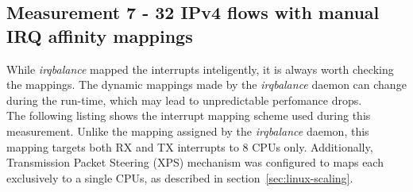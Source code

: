 
\subsection{Measurement 7 - 32 IPv4 flows with manual IRQ affinity mappings}
While {\it{irqbalance}} mapped the interrupts inteligently, it is always worth checking the mappings.
The dynamic mappings made by the {\it{irqbalance}} daemon can change during the run-time, which may lead
to unpredictable perfomance drops.
\\
The following listing shows the interrupt mapping scheme used during this measurement.
Unlike the mapping assigned by the {\it{irqbalance}} daemon,
this mapping targets both RX and TX interrupts to 8 CPUs only.
Additionally, Transmission Packet Steering (XPS) mechanism was configured
to maps each exclusively to a single CPUs, as described in section~\ref{sec:linux-scaling}.
